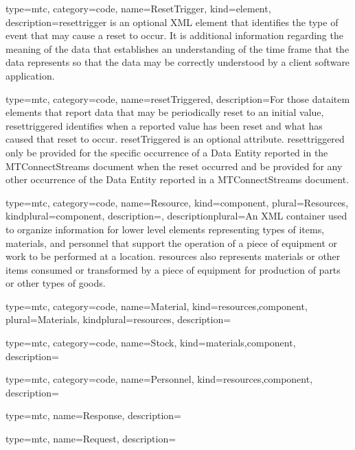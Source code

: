 {
  type=mtc,
  category=code,
  name={ResetTrigger},
  kind={element},
  description={\gls{resettrigger} is an optional XML element that identifies the type of event that may cause a reset to occur. It is additional information regarding the meaning of the data that establishes an understanding of the time frame that the data represents so that the data may be correctly understood by a client software application.}
}


{
  type=mtc,
  category=code,
  name={resetTriggered},
  description={For those \gls{dataitem} elements that report data that may be periodically reset to an initial value, \gls{resettriggered} identifies when a reported value has been reset and what has caused that reset to occur.  \newline resetTriggered is an optional attribute.  \newline \gls{resettriggered} \MUST only be provided for the specific occurrence of a Data Entity reported in the MTConnectStreams document when the reset occurred and \MUSTNOT be provided for any other occurrence of the Data Entity reported in a MTConnectStreams document.}
}


{
  type=mtc,
  category=code,
  name={Resource},
  kind={component},
  plural={Resources},
  kindplural={component},
  description={},
  descriptionplural={An XML container used to organize information for \gls{lower level} elements representing types of items, materials, and personnel that support the operation of a piece of equipment or work to be performed at a location. \glspl{resource} also represents materials or other items consumed or transformed by a piece of equipment for production of parts or other types of goods.}
}


{
  type=mtc,
  category=code,
  name={Material},
  kind={resources,component},
  plural={Materials},
  kindplural={resources},
  description={}
}


{
  type=mtc,
  category=code,
  name={Stock},
  kind={materials,component},
  description={}
}


{
  type=mtc,
  category=code,
  name={Personnel},
  kind={resources,component},
  description={}
}


{
  type=mtc,
  name={Response},
  description={}
}


{
  type=mtc,
  name={Request},
  description={}
}


